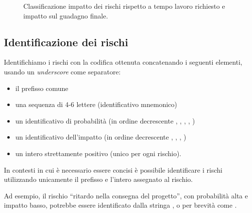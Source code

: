 \begin{figure}
	\caption{Classificazione impatto dei rischi rispetto a tempo lavoro richiesto e impatto sul guadagno finale.}
	\label{fig:rappresentazione_impatto}
\end{figure}

\subsection{Identificazione dei rischi}

Identifichiamo i rischi con la codifica ottenuta concatenando i seguenti elementi, usando un \emph{underscore} come separatore:
\begin{itemize}
	\item il prefisso comune 
	\item una sequenza di 4-6 lettere (identificativo mnemonico)
	\item un identificativo di probabilit\`a (in ordine decrescente , , , , )
	\item un identificativo dell'impatto (in ordine decrescente , , , )
	\item un intero strettamente positivo (unico per ogni rischio).
\end{itemize}
In contesti in cui \`e necessario essere concisi \`e possibile identificare i rischi utilizzando unicamente il prefisso  e l'intero assegnato al rischio.

Ad esempio, il rischio ``ritardo nella consegna del progetto'', con probabilit\`a alta e impatto basso, potrebbe essere identificato dalla stringa , o per brevit\`a come .

